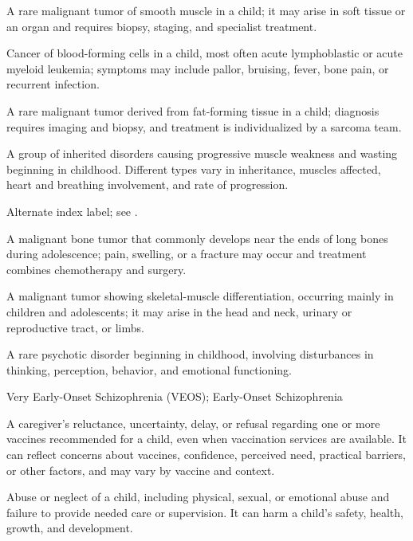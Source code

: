  A rare malignant tumor of smooth muscle in a child; it may arise in soft tissue or an organ and requires biopsy, staging, and specialist treatment.

 Cancer of blood-forming cells in a child, most often acute lymphoblastic or acute myeloid leukemia; symptoms may include pallor, bruising, fever, bone pain, or recurrent infection.

 A rare malignant tumor derived from fat-forming tissue in a child; diagnosis requires imaging and biopsy, and treatment is individualized by a sarcoma team.

 A group of inherited disorders causing progressive muscle weakness and wasting beginning in childhood. Different types vary in inheritance, muscles affected, heart and breathing involvement, and rate of progression.

 Alternate index label; see .

 A malignant bone tumor that commonly develops near the ends of long bones during adolescence; pain, swelling, or a fracture may occur and treatment combines chemotherapy and surgery.

 A malignant tumor showing skeletal-muscle differentiation, occurring mainly in children and adolescents; it may arise in the head and neck, urinary or reproductive tract, or limbs.

 A rare psychotic disorder beginning in childhood, involving disturbances in thinking, perception, behavior, and emotional functioning.

\synonyms
Very Early-Onset Schizophrenia (VEOS); Early-Onset Schizophrenia

 A caregiver’s reluctance, uncertainty, delay, or refusal regarding one or more vaccines recommended for a child, even when vaccination services are available. It can reflect concerns about vaccines, confidence, perceived need, practical barriers, or other factors, and may vary by vaccine and context.

 Abuse or neglect of a child, including physical, sexual, or emotional abuse and failure to provide needed care or supervision. It can harm a child’s safety, health, growth, and development.

